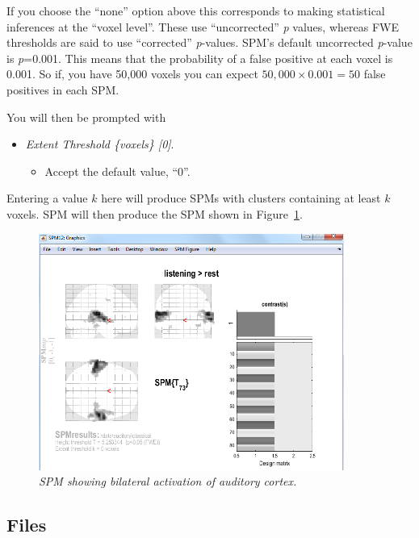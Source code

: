 If you choose the ``none'' option above this corresponds to making statistical inferences at the ``voxel level''. These use ``uncorrected'' \textit{p} values, whereas FWE thresholds are said to use ``corrected'' \textit{p}-values. SPM's default uncorrected \textit{p}-value is \textit{p}=0.001. This means that the probability of a false positive at each voxel is 0.001. So if, you have 50,000 voxels you can expect $50,000 \times 0.001 = 50$ false positives in each SPM.


You will then be prompted with

\begin{itemize}
\item \emph{Extent Threshold \{voxels\} [0]}.
\begin{itemize}
\item Accept the default value, ``0''.
\end{itemize}
\end{itemize}

Entering a value $k$ here will produce SPMs with clusters containing at least $k$ voxels. SPM will then produce the SPM shown in Figure~\ref{aud_spm1}.

\begin{figure}
\begin{center}
\includegraphics[width=100mm]{auditory/spm1}
\caption{\em SPM showing bilateral activation of auditory cortex. \label{aud_spm1}}
\end{center}
\end{figure}

\subsection{Files}


